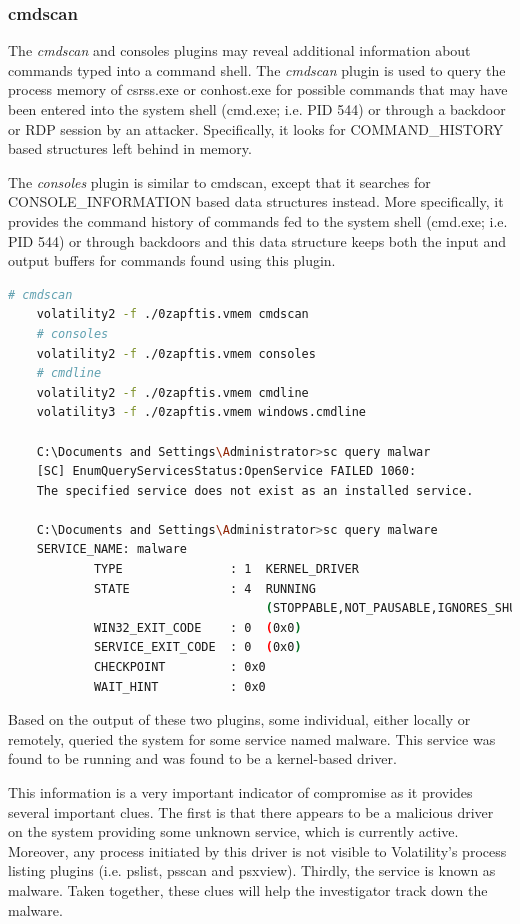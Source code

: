 \subsubsection{cmdscan}
The \textit{cmdscan} and consoles plugins may reveal additional information about commands typed into a command shell. The \textit{cmdscan} plugin is used to query the process memory of csrss.exe or conhost.exe for possible commands that may have been entered into the system shell (cmd.exe; i.e. PID 544) or through a backdoor or RDP session by an attacker. Specifically, it looks for COMMAND\_HISTORY based structures left behind in memory.

The \textit{consoles} plugin is similar to cmdscan, except that it searches for CONSOLE\_INFORMATION based data structures instead. More specifically, it provides the command history of commands fed to the system shell (cmd.exe; i.e. PID 544) or through backdoors and this data structure keeps both the input and output buffers for commands found using this plugin.

\begin{lstlisting}[language=bash]
    # cmdscan
    volatility2 -f ./0zapftis.vmem cmdscan
    # consoles
    volatility2 -f ./0zapftis.vmem consoles
    # cmdline
    volatility2 -f ./0zapftis.vmem cmdline
    volatility3 -f ./0zapftis.vmem windows.cmdline

    C:\Documents and Settings\Administrator>sc query malwar
    [SC] EnumQueryServicesStatus:OpenService FAILED 1060:
    The specified service does not exist as an installed service.

    C:\Documents and Settings\Administrator>sc query malware
    SERVICE_NAME: malware
            TYPE               : 1  KERNEL_DRIVER
            STATE              : 4  RUNNING
                                    (STOPPABLE,NOT_PAUSABLE,IGNORES_SHUTDOWN)
            WIN32_EXIT_CODE    : 0  (0x0)
            SERVICE_EXIT_CODE  : 0  (0x0)
            CHECKPOINT         : 0x0
            WAIT_HINT          : 0x0
\end{lstlisting}

Based on the output of these two plugins, some individual, either locally or remotely, queried the system for some service named malware. This service was found to be running and was found to be a kernel-based driver.

This information is a very important indicator of compromise as it provides several important clues. The first is that there appears to be a malicious driver on the system providing some unknown service, which is currently active. Moreover, any process initiated by this driver is not visible to Volatility’s process listing plugins (i.e. pslist, psscan and psxview). Thirdly, the service is known as malware. Taken together, these clues will help the investigator track down the malware.

